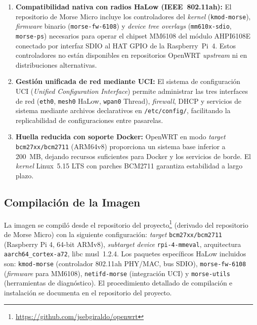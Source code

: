 \begin{enumerate}
    \item \textbf{Compatibilidad nativa con radios HaLow (IEEE~802.11ah):} El repositorio de Morse Micro incluye los controladores del \emph{kernel} (\texttt{kmod-morse}), \emph{firmware} binario (\texttt{morse-fw-6108}) y \emph{device tree overlays} (\texttt{mm610x-sdio}, \texttt{morse-ps}) necesarios para operar el chipset MM6108 del módulo AHPI6108E conectado por interfaz SDIO al HAT GPIO de la Raspberry~Pi~4.  Estos controladores no están disponibles en repositorios OpenWRT \emph{upstream} ni en distribuciones alternativas.
    \item \textbf{Gestión unificada de red mediante UCI:} El sistema de configuración UCI (\emph{Unified Configuration Interface}) permite administrar las tres interfaces de red (\texttt{eth0}, \texttt{mesh0} HaLow, \texttt{wpan0} Thread), \emph{firewall}, DHCP y servicios de sistema mediante archivos declarativos en \texttt{/etc/config/}, facilitando la replicabilidad de configuraciones entre pasarelas.
    \item \textbf{Huella reducida con soporte Docker:} OpenWRT en modo \emph{target} \texttt{bcm27xx/bcm2711} (ARM64v8) proporciona un sistema base inferior a 200~MB, dejando recursos suficientes para Docker y los servicios de borde.  El \emph{kernel} Linux~5.15 LTS con parches BCM2711 garantiza estabilidad a largo plazo.
\end{enumerate}

\subsection{Compilación de la Imagen}
\label{sec:gateway-openwrt-build}

La imagen se compiló desde el repositorio del proyecto\footnote{\url{https://github.com/jsebgiraldo/openwrt}} (derivado del repositorio de Morse Micro) con la siguiente configuración: \emph{target} \texttt{bcm27xx/bcm2711} (Raspberry Pi 4, 64-bit ARMv8), \emph{subtarget device} \texttt{rpi-4-mmeval}, arquitectura \texttt{aarch64\_cortex-a72}, libc musl~1.2.4.  Los paquetes específicos HaLow incluidos son: \texttt{kmod-morse} (controlador 802.11ah PHY/MAC, bus SDIO), \texttt{morse-fw-6108} (\emph{firmware} para MM6108), \texttt{netifd-morse} (integración UCI) y \texttt{morse-utils} (herramientas de diagnóstico).  El procedimiento detallado de compilación e instalación se documenta en el repositorio del proyecto.

